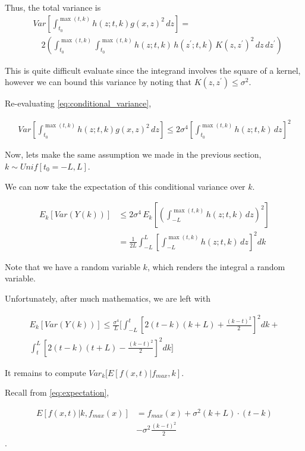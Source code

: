 Thus, the total variance is 
\begin{align}
\label{eq:conditional_variance}
    &Var\!\left[\int_{t_0}^{\max(t,k)} h(z; t, k) g(x,z)^2\,dz\right] = \nonumber\\
    &\quad 2\!\left(\int_{t_0}^{\max(t,k)}\!\int_{t_0}^{\max(t,k)} h(z; t, k)\, h(z^{'}; t, k)\,K(z,z^{'})^2\,dz\,dz^{'}\right)
\end{align}

This is quite difficult evaluate since the integrand involves the square of a kernel, however we can bound this variance by noting that $K(z,z^{'}) \leq \sigma^2$. 

Re-evaluating \eqref{eq:conditional_variance}, 

\begin{align}
     Var\!\left[\int_{t_0}^{\max(t,k)} h(z; t,k) g(x,z)^2\,dz\right] \leq 2 \sigma^4 \left[\int_{t_0}^{\max(t,k)} h(z; t, k)\, dz\right]^2
\end{align}

Now, lets make the same assumption we made in the previous section, $k \sim Unif[t_0 = -L, L]$. 

We can now take the expectation of this conditional variance over $k$.

\begin{align}
    E_k[Var(Y(k))] &\leq 2\sigma^4\, E_k\!\left[\left(\int_{-L}^{\max(t,k)} h(z; t, k)\, dz\right)^2\right] \nonumber\\
    &= \frac{1}{2L} \int_{-L}^L\left[\int_{-L}^{\max(t,k)} h(z; t, k)\, dz\right]^2 dk
\end{align}

Note that we have a random variable $k$, which renders the integral a random variable. 

Unfortunately, after much mathematics, we are left with

\begin{align}
\label{eq:expectation_k}
    E_k[Var(Y(k))] \leq \frac{\sigma^4}{L} \bigg[\int_{-L}^t [2(t-k)(k+L) +  \frac{(k-t)^2}{2}]^2 dk + \nonumber \\ \int_t^L [2(t-k)(t+L) - \frac{(k-t)^2}{2}]^2 dk \bigg] 
\end{align}

It remains to compute $Var_k[E[f(x,t) | f_{max}, k]$. 

Recall from \eqref{eq:expectation},

\begin{align}
\label{eq:expectation_simple}
     E[f(x,t)|k, f_{max}(x)] & = f_{max}(x) + \sigma^2(k + L)\cdot(t-k) \nonumber \\ & -\sigma^2 \frac{(k-t)^2}{2} 
\end{align}.

